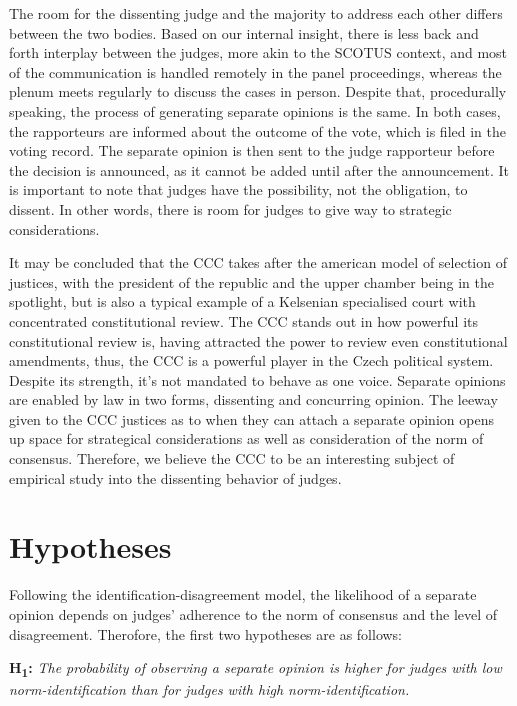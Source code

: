 \documentclass[
  11pt,
]{article}
\begin{document}
The room for the dissenting judge and the majority to address each other
differs between the two bodies. Based on our internal insight, there is
less back and forth interplay between the judges, more akin to the
SCOTUS context, and most of the communication is handled remotely in the
panel proceedings, whereas the plenum meets regularly to discuss the
cases in person. Despite that, procedurally speaking, the process of
generating separate opinions is the same. In both cases, the rapporteurs
are informed about the outcome of the vote, which is filed in the voting
record. The separate opinion is then sent to the judge rapporteur before
the decision is announced, as it cannot be added until after the
announcement. It is important to note that judges have the possibility,
not the obligation, to dissent. In other words, there is room for judges
to give way to strategic considerations.

It may be concluded that the CCC takes after the american model of
selection of justices, with the president of the republic and the upper
chamber being in the spotlight, but is also a typical example of a
Kelsenian specialised court with concentrated constitutional review. The
CCC stands out in how powerful its constitutional review is, having
attracted the power to review even constitutional amendments, thus, the
CCC is a powerful player in the Czech political system. Despite its
strength, it's not mandated to behave as one voice. Separate opinions
are enabled by law in two forms, dissenting and concurring opinion. The
leeway given to the CCC justices as to when they can attach a separate
opinion opens up space for strategical considerations as well as
consideration of the norm of consensus. Therefore, we believe the CCC to
be an interesting subject of empirical study into the dissenting
behavior of judges.

\hypertarget{hypotheses}{%
\section{Hypotheses}\label{hypotheses}}

Following the identification-disagreement model, the likelihood of a
separate opinion depends on judges' adherence to the norm of consensus
and the level of disagreement. Therofore, the first two hypotheses are
as follows:

\textbf{H\textsubscript{1}:} \emph{The probability of observing a
separate opinion is higher for judges with low norm-identification than
for judges with high norm-identification.}
\end{document}
